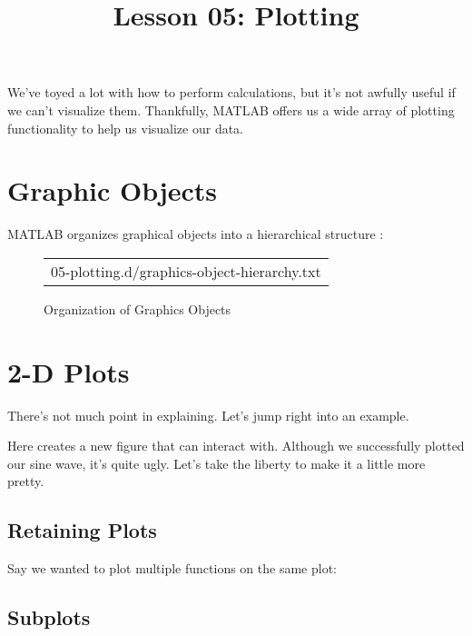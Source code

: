 \documentclass{article}
\title{Lesson 05: Plotting}
\begin{document}
\renderTitle

We've toyed a lot with how to perform calculations, but it's not awfully
useful if we can't visualize them.  Thankfully, MATLAB offers us a wide
array of plotting functionality to help us visualize our data.

\section{Graphic Objects}

MATLAB organizes graphical objects into a hierarchical structure%
:

\begin{figure}[!ht]
\Centering
\small
\begin{tabular}{c}
	{05-plotting.d/graphics-object-hierarchy.txt}
\end{tabular}
\caption{Organization of Graphics Objects}
\end{figure}

\section{2-D Plots}

There's not much point in explaining.  Let's jump right into an example.


Here  creates a new figure that  can interact with.  Although we
successfully plotted our sine wave, it's quite ugly.  Let's take the
liberty to make it a little more pretty.


\subsection{Retaining Plots}

Say we wanted to plot multiple functions on the same plot:



\subsection{Subplots}
\end{document}
